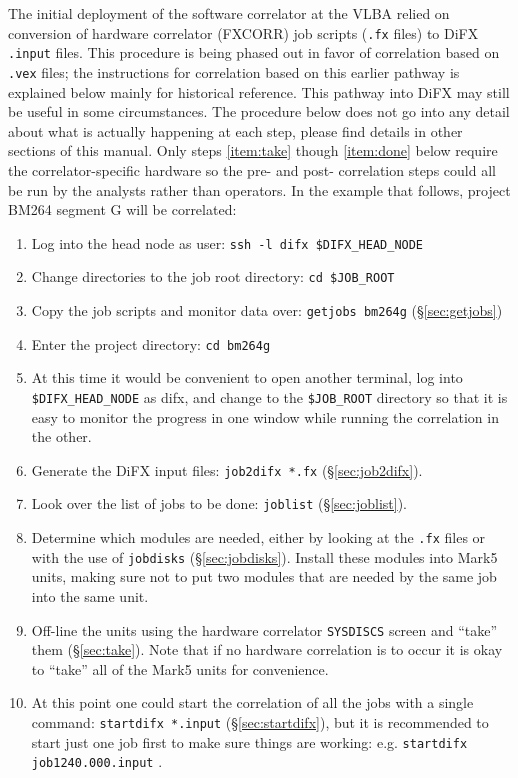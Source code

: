 The initial deployment of the software correlator at the VLBA relied on conversion of hardware correlator (FXCORR) job scripts ({\tt .fx} files) to DiFX {\tt .input} files.
This procedure is being phased out in favor of correlation based on {\tt .vex} files; the instructions for correlation based on this earlier pathway is explained below mainly for historical reference.
This pathway into DiFX may still be useful in some circumstances.
The procedure below does not go into any detail about what is actually happening at each step, please find details in other sections of this manual.
Only steps \ref{item:take} though \ref{item:done} below require the correlator-specific hardware so the pre- and post- correlation steps could all be run by the analysts rather than operators.
In the example that follows, project BM264 segment G will be correlated:
\begin{enumerate}
\item Log into the head node as user: {\tt ssh -l difx \$DIFX\_HEAD\_NODE}
\item Change directories to the job root directory: {\tt cd \$JOB\_ROOT}
\item Copy the job scripts and monitor data over: {\tt getjobs bm264g} (\S\ref{sec:getjobs})
\item Enter the project directory: {\tt cd bm264g}
\item At this time it would be convenient to open another terminal, log into {\tt \$DIFX\_HEAD\_NODE} as difx, and change to the {\tt \$JOB\_ROOT} directory so that it is easy to monitor the progress in one window while running the correlation in the other.
\item Generate the DiFX input files: {\tt job2difx *.fx} (\S\ref{sec:job2difx}).
\item Look over the list of jobs to be done: {\tt joblist} (\S\ref{sec:joblist}). \label{item:jl}
\item Determine which modules are needed, either by looking at the {\tt .fx} files or with the use of {\tt jobdisks} (\S\ref{sec:jobdisks}).
Install these modules into Mark5 units, making sure not to put two modules that are needed by the same job into the same unit.
\item Off-line the units using the hardware correlator {\tt SYSDISCS} screen and ``take'' them (\S\ref{sec:take}). \label{item:take}
Note that if no hardware correlation is to occur it is okay to ``take'' all of the Mark5 units for convenience.
\item \label{item:sd} At this point one could start the correlation of all the jobs with a single command: {\tt startdifx *.input} (\S\ref{sec:startdifx}), but it is recommended to start just one job first to make sure things are working: {e.g. \tt startdifx job1240.000.input} .

\end{enumerate}
